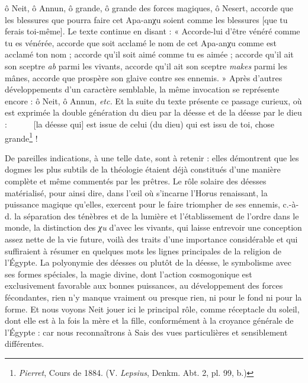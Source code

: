 \documentclass[a4paper, 11pt, oneside]{article}
\newcommand*\hieroglyhicsAAAH{}
\newcommand*\hieroglyhicsAABR{}
\newcommand*\hieroglyhicsAADU{}
\newcommand*\hieroglyhicsAAFN{\raisebox{0.5ex}{}}
\newcommand*\hieroglyhicsAALX{\raisebox{0.5ex}{}}
\newcommand*\hieroglyhicsAASD{}
\newcommand*\hieroglyhicsAASE{}
\newcommand*\hieroglyhicsAASF{}
\begin{document}
ô Neit, ô Annun, ô grande, ô grande des forces magiques, ô Nesert, accorde que les blessures que pourra faire cet Apa-anχu soient comme les blessures [que tu ferais toi-même]. Le texte continue en disant : « Accorde-lui d'être vénéré comme tu es vénérée, accorde que soit acclamé le nom de cet Apa-anχu comme est acclamé ton nom ; accorde qu'il soit aimé comme tu es aimée ; accorde qu'il ait son sceptre \emph{ab} parmi les vivants, accorde qu'il ait son sceptre \emph{makes} parmi les mânes, accorde que prospère son glaive contre ses ennemis. » Après d'autres développements d'un caractère semblable, la même invocation se représente encore : ô Neit, ô Annun, \emph{etc.} Et la suite du texte présente ce passage curieux, où est exprimée la double génération du dieu par la déesse et de la déesse par le dieu : $\hieroglyhicsAADU\:\hieroglyhicsAAAH\:\hieroglyhicsAABR\allowbreak\:\hieroglyhicsAAFN\:\hieroglyhicsAADU\:\hieroglyhicsAASD\allowbreak\:\hieroglyhicsAAAH\:\hieroglyhicsAABR\:\hieroglyhicsAALX\allowbreak\:\hieroglyhicsAAAH\:\hieroglyhicsAASE\:\hieroglyhicsAASF$ [la déesse qui] est issue de celui (du dieu) qui est issu de toi, chose grande\footnote{\emph{Pierret}, Cours de 1884. (V. \emph{Lepsius}, Denkm. Abt. 2, pl. 99, b.)} !

De pareilles indications, à une telle date, sont à retenir : elles démontrent que les dogmes les plus subtils de la théologie étaient déjà constitués d'une manière complète et même commentés par les prêtres. Le rôle solaire des déesses matérialisé, pour ainsi dire, dans l'œil où s'incarne l'Horus renaissant, la puissance magique qu'elles, exercent pour le faire triompher de ses ennemis, c.-à-d. la séparation des ténèbres et de la lumière et l'établissement de l'ordre dans le monde, la distinction des \emph{χu} d'avec les vivants, qui laisse entrevoir une conception assez nette de la vie future, voilà des traits d'une importance considérable et qui suffiraient à résumer en quelques mots les lignes principales de la religion de l'Égypte. La polyonymie des déesses ou plutôt de la déesse, le symbolisme avec ses formes spéciales, la magie divine, dont l'action cosmogonique est exclusivement favorable aux bonnes puissances, au développement des forces fécondantes, rien n'y manque vraiment ou presque rien, ni pour le fond ni pour la forme. Et nous voyons Neit jouer ici le principal rôle, comme réceptacle du soleil, dont elle est à la fois la mère et la fille, conformément à la croyance générale de l'Égypte : car nous reconnaîtrons à Sais des vues particulières et sensiblement différentes.
\end{document}
